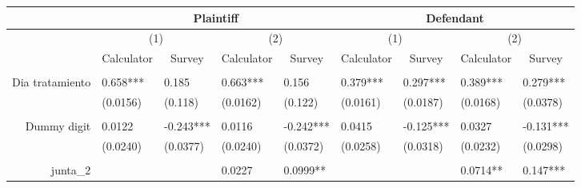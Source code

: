 \begin{tabular}{rrrrrrrrr}
\toprule
      & \multicolumn{4}{c}{Plaintiff} & \multicolumn{4}{c}{Defendant} \\
\midrule
      & \multicolumn{2}{c}{(1)} & \multicolumn{2}{c}{(2)} & \multicolumn{2}{c}{(1)} & \multicolumn{2}{c}{(2)} \\
      & \multicolumn{1}{c}{Calculator} & \multicolumn{1}{c}{Survey} & \multicolumn{1}{c}{Calculator} & \multicolumn{1}{c}{Survey} & \multicolumn{1}{c}{Calculator} & \multicolumn{1}{c}{Survey} & \multicolumn{1}{c}{Calculator} & \multicolumn{1}{c}{Survey} \\
      &       &       &       &       &       &       &       &  \\
Dia tratamiento & \multicolumn{1}{l}{0.658***} & \multicolumn{1}{l}{0.185} & \multicolumn{1}{l}{0.663***} & \multicolumn{1}{l}{0.156} & \multicolumn{1}{l}{0.379***} & \multicolumn{1}{l}{0.297***} & \multicolumn{1}{l}{0.389***} & \multicolumn{1}{l}{0.279***} \\
      & \multicolumn{1}{l}{(0.0156)} & \multicolumn{1}{l}{(0.118)} & \multicolumn{1}{l}{(0.0162)} & \multicolumn{1}{l}{(0.122)} & \multicolumn{1}{l}{(0.0161)} & \multicolumn{1}{l}{(0.0187)} & \multicolumn{1}{l}{(0.0168)} & \multicolumn{1}{l}{(0.0378)} \\
      & \multicolumn{1}{l}{} & \multicolumn{1}{l}{} & \multicolumn{1}{l}{} & \multicolumn{1}{l}{} & \multicolumn{1}{l}{} & \multicolumn{1}{l}{} & \multicolumn{1}{l}{} & \multicolumn{1}{l}{} \\
Dummy digit & \multicolumn{1}{l}{0.0122} & \multicolumn{1}{l}{-0.243***} & \multicolumn{1}{l}{0.0116} & \multicolumn{1}{l}{-0.242***} & \multicolumn{1}{l}{0.0415} & \multicolumn{1}{l}{-0.125***} & \multicolumn{1}{l}{0.0327} & \multicolumn{1}{l}{-0.131***} \\
      & \multicolumn{1}{l}{(0.0240)} & \multicolumn{1}{l}{(0.0377)} & \multicolumn{1}{l}{(0.0240)} & \multicolumn{1}{l}{(0.0372)} & \multicolumn{1}{l}{(0.0258)} & \multicolumn{1}{l}{(0.0318)} & \multicolumn{1}{l}{(0.0232)} & \multicolumn{1}{l}{(0.0298)} \\
      & \multicolumn{1}{l}{} & \multicolumn{1}{l}{} & \multicolumn{1}{l}{} & \multicolumn{1}{l}{} & \multicolumn{1}{l}{} & \multicolumn{1}{l}{} & \multicolumn{1}{l}{} & \multicolumn{1}{l}{} \\
junta\_2 & \multicolumn{1}{l}{} & \multicolumn{1}{l}{} & \multicolumn{1}{l}{0.0227} & \multicolumn{1}{l}{0.0999**} & \multicolumn{1}{l}{} & \multicolumn{1}{l}{} & \multicolumn{1}{l}{0.0714**} & \multicolumn{1}{l}{0.147***} \\

\end{tabular}
